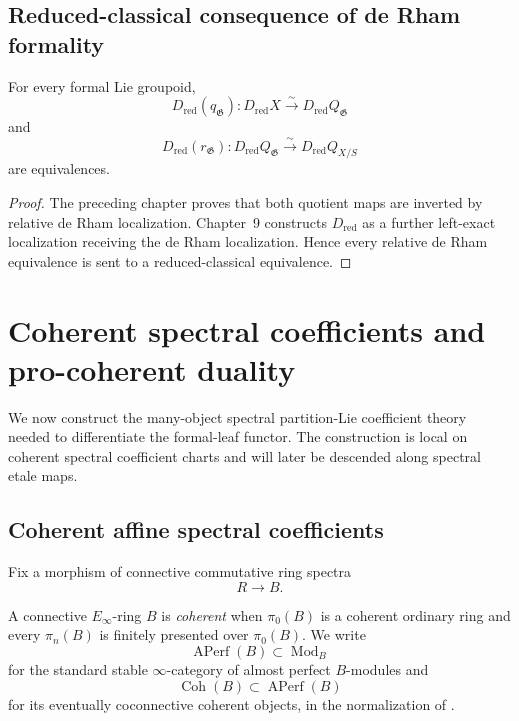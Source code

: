 \subsection{Reduced-classical consequence of de Rham formality}

\begin{proposition}
\label{prop:bnla-formal-quotient-reduced-equivalence}
For every formal Lie groupoid,
\[
    D_{\mathrm{red}}(q_{\mathfrak G}):
    D_{\mathrm{red}}X
    \xrightarrow{\sim}
    D_{\mathrm{red}}Q_{\mathfrak G}
\]
and
\[
    D_{\mathrm{red}}(r_{\mathfrak G}):
    D_{\mathrm{red}}Q_{\mathfrak G}
    \xrightarrow{\sim}
    D_{\mathrm{red}}Q_{X/S}
\]
are equivalences.
\end{proposition}

\begin{proof}
The preceding chapter proves that both quotient maps are inverted by relative
de Rham localization.  Chapter~9 constructs $D_{\mathrm{red}}$ as a further
left-exact localization receiving the de Rham localization.  Hence every
relative de Rham equivalence is sent to a reduced-classical equivalence.
\end{proof}
\section{Coherent spectral coefficients and pro-coherent duality}
\label{sec:bnla-spectral-procoherent}

We now construct the many-object spectral partition-Lie coefficient theory
needed to differentiate the formal-leaf functor.  The construction is local on
coherent spectral coefficient charts and will later be descended along
spectral etale maps.

\subsection{Coherent affine spectral coefficients}

Fix a morphism of connective commutative ring spectra
\[
    R\longrightarrow B.
\]

\begin{definition}
\label{def:bnla-coherent-spectral-ring}
A connective $E_\infty$-ring $B$ is \emph{coherent} when $\pi_0(B)$ is a
coherent ordinary ring and every $\pi_n(B)$ is finitely presented over
$\pi_0(B)$.  We write
\[
    \operatorname{APerf}(B)\subset\operatorname{Mod}_B
\]
for the standard stable $\infty$-category of almost perfect $B$-modules and
\[
    \operatorname{Coh}(B)\subset\operatorname{APerf}(B)
\]
for its eventually coconnective coherent objects, in the normalization of
\cite{BrantnerCamposNuiten2025}.
\end{definition}


